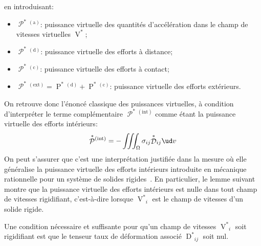en introduisant:
\begin{itemize}
    \item $\mathop{\mathcal{P}}^{\ast}{\!}^{(\text{a})}$: puissance virtuelle des quantités d'accélération dans le champ de vitesses virtuelles $\mathop{V}^{\ast}$;
    \item $\mathop{\mathcal{P}}^{\ast}{\!}^{(\text{d})}$: puissance virtuelle des efforts à distance;
    \item $\mathop{\mathcal{P}}^{\ast}{\!}^{(\text{c})}$: puissance virtuelle des efforts à contact;
    \item $\mathop{\mathcal{P}}^{\ast}{\!}^{(\text{ext})} = \mathop{P}^{\ast}{\!}^{(\text{d})} + \mathop{P}^{\ast}{\!}^{(\text{c})}$: puissance virtuelle des efforts extérieurs.
\end{itemize}
On retrouve donc l'énoncé classique des puissances virtuelles, à condition d'interpréter le terme complémentaire $\mathop{\mathcal{P}}^{\ast}{\!}^{(\text{int})}$ comme étant la puissance virtuelle des efforts intérieurs:
\begin{equation}
    \mathop{\mathcal{P}}^{\ast}{\!}^{(\text{int})}=-\iiint_\Omega \sigma_{ij}{\mathop{\mathcal{D}}^{\ast}}_{ij} \ud v
    \label{eq:Ch01-025}
\end{equation}
On peut s'assurer que c'est une interprétation justifiée dans la mesure où elle généralise la puissance virtuelle des efforts intérieurs introduite en mécanique rationnelle pour un système de solides rigides~\cite{Germain-62,Gontier-69}.
En particulier, le lemme suivant montre que la puissance virtuelle des efforts intérieurs est nulle dans tout champ de vitesses rigidifiant, c'est-à-dire lorsque ${\mathop{V}^{\ast}}_i$ est le champ de vitesses d'un solide rigide. 

\begin{lem}
    Une condition nécessaire et suffisante pour qu'un champ de vitesses ${\mathop{V}^{\ast}}_i$ soit rigidifiant est que le tenseur taux de déformation associé ${\mathop{D}^{\ast}}_{ij}$ soit nul.
    \label{lem:Ch01-3}
\end{lem}


